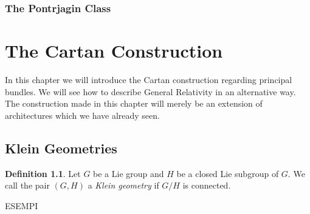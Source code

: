 \documentclass[12pt,a4paper]{report}
\theoremstyle{definition}
\newtheorem{Def}{Definition}[chapter]
\theoremstyle{Theorem}
\theoremstyle{break}
\theoremstyle{definition}
\begin{document}
			\subsection{The Pontrjagin Class}
		\chapter{The Cartan Construction}
		In this chapter we will introduce the Cartan construction regarding principal bundles. We will see how to describe General Relativity in an alternative way. The construction made in this chapter will merely be an extension of architectures which we have already seen. 
		\section{Klein Geometries}
		\begin{Def}
			Let $G$ be a Lie group and $H$ be a closed Lie subgroup of $G$. We call the pair $(G,H)$ a \textit{Klein geometry} if $G/H$ is connected.
		\end{Def}
		ESEMPI
\end{document}
